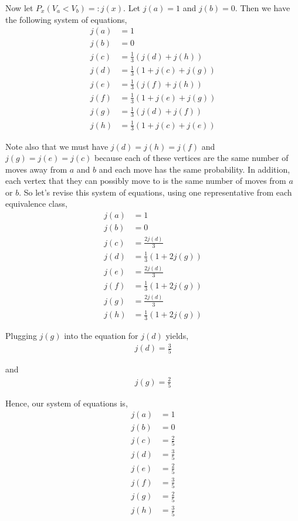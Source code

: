\documentclass[12pt]{article}
\begin{document}
Now let $P_x(V_a < V_b) =: j(x)$. Let $j(a) = 1$ and $j(b) = 0$. Then we have the following system of equations,
\begin{align*}
j(a) &= 1\\
j(b) &= 0\\
j(c) &= \frac{1}{3}(j(d) + j(h))\\
j(d) &= \frac{1}{3}(1 + j(c) + j(g))\\
j(e) &= \frac{1}{3}(j(f) + j(h))\\
j(f) &= \frac{1}{3}(1 + j(e) + j(g))\\
j(g) &= \frac{1}{3}(j(d) + j(f))\\
j(h) &= \frac{1}{3}(1 + j(c) + j(e))
\end{align*}

Note also that we must have $j(d) = j(h) = j(f)$ and $j(g) = j(e) = j(c)$ because each of these vertices are the same number of moves away from $a$ and $b$ and each move has the same probability. In addition, each vertex that they can possibly move to is the same number of moves from $a$ or $b$. So let's revise this system of equations, using one representative from each equivalence class,
\begin{align*}
j(a) &= 1\\
j(b) &= 0\\
j(c) &= \frac{2j(d)}{3}\\
j(d) &= \frac{1}{3}(1 + 2j(g))\\
j(e) &= \frac{2j(d)}{3}\\
j(f) &= \frac{1}{3}(1 + 2j(g))\\
j(g) &= \frac{2j(d)}{3}\\
j(h) &= \frac{1}{3}(1 + 2j(g))
\end{align*}

Plugging $j(g)$ into the equation for $j(d)$ yields,
\begin{align*}
j(d) = \frac{3}{5}
\end{align*}

and
\begin{align*}
j(g) = \frac{2}{5}
\end{align*}

Hence, our system of equations is,
\begin{align*}
j(a) &= 1\\
j(b) &= 0\\
j(c) &= \frac{2}{5}\\
j(d) &= \frac{3}{5}\\
j(e) &=\frac{2}{5}\\
j(f) &= \frac{3}{5}\\
j(g) &= \frac{2}{5}\\
j(h) &= \frac{3}{5}
\end{align*}
\end{document}
